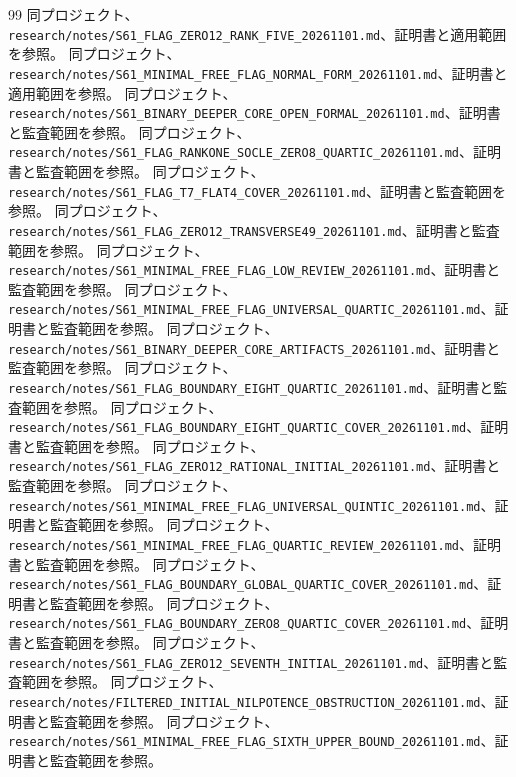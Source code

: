 \documentclass[11pt,a4paper]{ltjsarticle}
\theoremstyle{remark}
\begin{document}
\begin{thebibliography}{99}
 同プロジェクト、\nolinkurl{research/notes/S61_FLAG_ZERO12_RANK_FIVE_20261101.md}、証明書と適用範囲を参照。
 同プロジェクト、\nolinkurl{research/notes/S61_MINIMAL_FREE_FLAG_NORMAL_FORM_20261101.md}、証明書と適用範囲を参照。
 同プロジェクト、\nolinkurl{research/notes/S61_BINARY_DEEPER_CORE_OPEN_FORMAL_20261101.md}、証明書と監査範囲を参照。
 同プロジェクト、\nolinkurl{research/notes/S61_FLAG_RANKONE_SOCLE_ZERO8_QUARTIC_20261101.md}、証明書と監査範囲を参照。
 同プロジェクト、\nolinkurl{research/notes/S61_FLAG_T7_FLAT4_COVER_20261101.md}、証明書と監査範囲を参照。
 同プロジェクト、\nolinkurl{research/notes/S61_FLAG_ZERO12_TRANSVERSE49_20261101.md}、証明書と監査範囲を参照。
 同プロジェクト、\nolinkurl{research/notes/S61_MINIMAL_FREE_FLAG_LOW_REVIEW_20261101.md}、証明書と監査範囲を参照。
 同プロジェクト、\nolinkurl{research/notes/S61_MINIMAL_FREE_FLAG_UNIVERSAL_QUARTIC_20261101.md}、証明書と監査範囲を参照。
 同プロジェクト、\nolinkurl{research/notes/S61_BINARY_DEEPER_CORE_ARTIFACTS_20261101.md}、証明書と監査範囲を参照。
 同プロジェクト、\nolinkurl{research/notes/S61_FLAG_BOUNDARY_EIGHT_QUARTIC_20261101.md}、証明書と監査範囲を参照。
 同プロジェクト、\nolinkurl{research/notes/S61_FLAG_BOUNDARY_EIGHT_QUARTIC_COVER_20261101.md}、証明書と監査範囲を参照。
 同プロジェクト、\nolinkurl{research/notes/S61_FLAG_ZERO12_RATIONAL_INITIAL_20261101.md}、証明書と監査範囲を参照。
 同プロジェクト、\nolinkurl{research/notes/S61_MINIMAL_FREE_FLAG_UNIVERSAL_QUINTIC_20261101.md}、証明書と監査範囲を参照。
 同プロジェクト、\nolinkurl{research/notes/S61_MINIMAL_FREE_FLAG_QUARTIC_REVIEW_20261101.md}、証明書と監査範囲を参照。
 同プロジェクト、\nolinkurl{research/notes/S61_FLAG_BOUNDARY_GLOBAL_QUARTIC_COVER_20261101.md}、証明書と監査範囲を参照。
 同プロジェクト、\nolinkurl{research/notes/S61_FLAG_BOUNDARY_ZERO8_QUARTIC_COVER_20261101.md}、証明書と監査範囲を参照。
 同プロジェクト、\nolinkurl{research/notes/S61_FLAG_ZERO12_SEVENTH_INITIAL_20261101.md}、証明書と監査範囲を参照。
 同プロジェクト、\nolinkurl{research/notes/FILTERED_INITIAL_NILPOTENCE_OBSTRUCTION_20261101.md}、証明書と監査範囲を参照。
 同プロジェクト、\nolinkurl{research/notes/S61_MINIMAL_FREE_FLAG_SIXTH_UPPER_BOUND_20261101.md}、証明書と監査範囲を参照。

\end{thebibliography}
\end{document}
